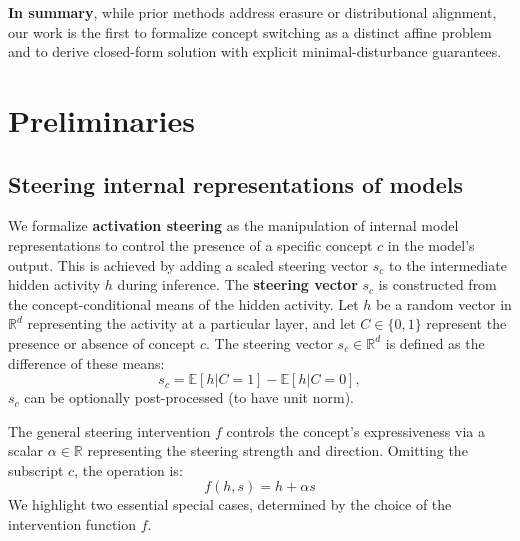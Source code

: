 \documentclass{article}
\theoremstyle{plain}
\theoremstyle{definition}
\theoremstyle{remark}
\newcommand{\ili}[1]{\textbf{[Ili]}  \; {\color{blue}#1}}
\begin{document}
\noindent \textbf{In summary}, while prior methods address erasure or distributional alignment, our work is the first to formalize concept switching as a distinct affine problem and to derive closed-form solution with explicit minimal-disturbance guarantees. 


\section{Preliminaries}

\subsection{Steering internal representations of models}
\label{sec:steering}

\noindent We formalize \textbf{activation steering} as the manipulation of internal model representations to control the presence of a specific concept $c$ in the model's output. This is achieved by adding a scaled steering vector $s_c$ to the intermediate hidden activity $h$ during inference.
%
The \textbf{steering vector} $s_c$ is constructed from the concept-conditional means of the hidden activity. Let $h$ be a random vector in $\mathbb{R}^d$ representing the activity at a particular layer, and let $C \in \{0, 1\}$ represent the presence or absence of concept $c$. The steering vector $s_c \in \mathbb{R}^d$ is defined as the difference of these means:
\begin{equation}
	s_c = \mathbb{E}[h | C = 1] - \mathbb{E}[h | C = 0],
	\label{eq:casteer_steering_vector}
\end{equation}
$s_c$ can be optionally post-processed (to have unit norm).

\noindent The general steering intervention $f$ controls the concept's expressiveness via a scalar $\alpha \in \mathbb{R}$ representing the steering strength and direction. Omitting the subscript $c$, the operation is:
\begin{equation}
f(h, s) = h + \alpha s
\label{eq:general_steering}
\end{equation}
\noindent We highlight two essential special cases, determined by the choice of the intervention function $f$.
\end{document}
